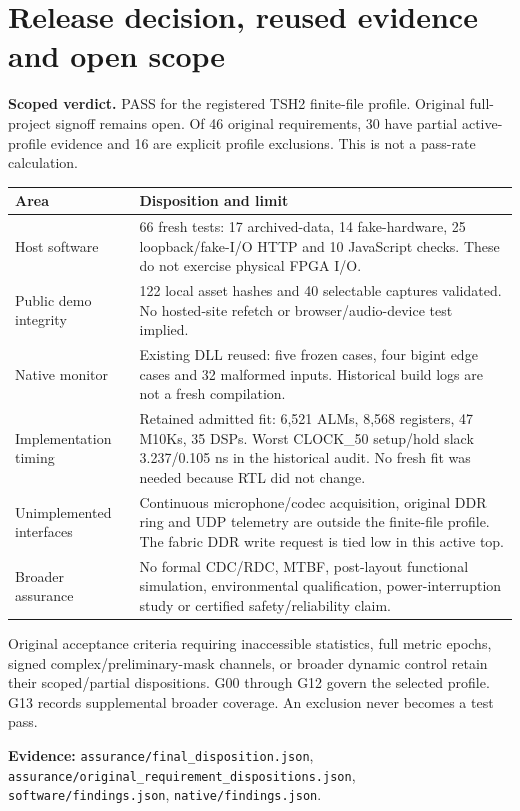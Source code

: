 \documentclass[11pt,letterpaper]{article}
\newcommand{\page}[1]{\clearpage\section{#1}}
\newcommand{\evidence}[1]{\par{\footnotesize\raggedright\sloppy\color{muted}\textbf{Evidence:} #1\par}}
\newcommand{\epath}[1]{\nolinkurl{#1}}
\newcommand{\callout}[2]{\par\medskip\noindent\textbf{#1.} #2\par\smallskip}
\begin{document}
\page{Release decision, reused evidence and open scope}
\callout{Scoped verdict}{PASS for the registered TSH2 finite-file profile. Original full-project signoff remains open. Of 46 original requirements, 30 have partial active-profile evidence and 16 are explicit profile exclusions. This is not a pass-rate calculation.}
\par\noindent\begin{minipage}{\linewidth}
\noindent\begin{tabularx}{\linewidth}{P{1.7in}L}
\toprule
\textbf{Area} & \textbf{Disposition and limit}\\
\midrule
Host software & 66 fresh tests: 17 archived-data, 14 fake-hardware, 25 loopback/fake-I/O HTTP and 10 JavaScript checks. These do not exercise physical FPGA I/O.\\
Public demo integrity & 122 local asset hashes and 40 selectable captures validated. No hosted-site refetch or browser/audio-device test implied.\\
Native monitor & Existing DLL reused: five frozen cases, four bigint edge cases and 32 malformed inputs. Historical build logs are not a fresh compilation.\\
Implementation timing & Retained admitted fit: 6,521 ALMs, 8,568 registers, 47 M10Ks, 35 DSPs. Worst CLOCK\_50 setup/hold slack 3.237/0.105 ns in the historical audit. No fresh fit was needed because RTL did not change.\\
Unimplemented interfaces & Continuous microphone/codec acquisition, original DDR ring and UDP telemetry are outside the finite-file profile. The fabric DDR write request is tied low in this active top.\\
Broader assurance & No formal CDC/RDC, MTBF, post-layout functional simulation, environmental qualification, power-interruption study or certified safety/reliability claim.\\
\bottomrule
\end{tabularx}\par\end{minipage}\par
Original acceptance criteria requiring inaccessible statistics, full metric epochs, signed complex/\allowbreak preliminary-mask channels, or broader dynamic control retain their scoped/partial dispositions. G00 through G12 govern the selected profile. G13 records supplemental broader coverage. An exclusion never becomes a test pass.
\evidence{\epath{assurance/final_disposition.json}, \epath{assurance/original_requirement_dispositions.json}, \epath{software/findings.json}, \epath{native/findings.json}.}
\end{document}
